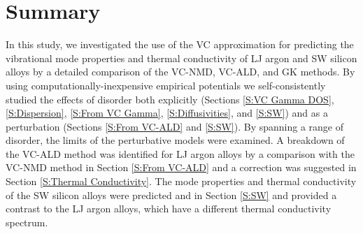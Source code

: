 \documentclass[12pt,twocolumn,iop]{/usr/share/texmf/tex/latex/iop/iopart}[/usr/share/texmf/tex/latex/iop/]
\begin{document}



\section{\label{S:Summary}Summary}

In this study, we investigated the use of the VC 
approximation for predicting the vibrational mode properties and 
thermal conductivity of LJ argon and SW silicon alloys 
by a detailed comparison of the VC-NMD, VC-ALD, and GK methods. 
By using computationally-inexpensive  
empirical potentials we self-consistently studied the effects of 
disorder both explicitly (Sections \ref{S:VC Gamma DOS}, 
\ref{S:Dispersion},  
\ref{S:From VC Gamma}, \ref{S:Diffusivities}, and \ref{S:SW}) 
and as a perturbation (Sections \ref{S:From VC-ALD} and \ref{S:SW}). 
By spanning a range of disorder, the limits of the 
perturbative models were examined.
A breakdown of the VC-ALD method was identified for LJ argon alloys 
by a comparison with the VC-NMD method in 
Section \ref{S:From VC-ALD}   
and a correction was suggested in Section \ref{S:Thermal Conductivity}. 
The mode properties and thermal 
conductivity of the SW silicon alloys were predicted and in 
Section \ref{S:SW} and provided a contrast to the 
LJ argon alloys, which have a different thermal conductivity 
spectrum. 
\end{document}
